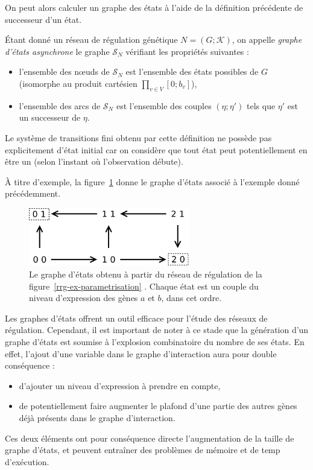 On peut alors calculer un graphe des états à l'aide de la définition précédente de successeur d'un état.
\begin{definition}
Étant donné un réseau de régulation génétique $N = (G ; \mathcal{K})$, on appelle \emph{graphe d'états asynchrone} le graphe $\mathcal{S}_N$ vérifiant les propriétés suivantes :
\begin{itemize}
  \item l'ensemble des n\oe uds de $\mathcal{S}_N$ est l'ensemble des états possibles de $G$ (isomorphe au produit cartésien $\prod_{v \in V} [0 ; b_v]$),
  \item l'ensemble des arcs de $\mathcal{S}_N$ est l'ensemble des couples $(\eta ; \eta')$ tels que $\eta'$ est un successeur de $\eta$.
\end{itemize}
\end{definition}

Le système de transitions fini obtenu par cette définition ne possède pas explicitement d'état initial car on considère que tout état peut potentiellement en être un (selon l'instant où l'observation débute).

À titre d'exemple, la figure~\ref{rrg-graphe-d-etats} donne le graphe d'états associé à l'exemple donné précédemment.

\begin{figure}[ht]
  \centering\includegraphics[width=7cm]{figs/graphe-d-etats}
  \caption{Le graphe d'états obtenu à partir du réseau de régulation de la figure~\ref{rrg-ex-parametrisation} \cite{richard-comet-bernot-08}. Chaque état est un couple du niveau d'expression des gènes $a$ et $b$, dans cet ordre.}
  \label{rrg-graphe-d-etats}
\end{figure}

Les graphes d'états offrent un outil efficace pour l'étude des réseaux de régulation. Cependant, il est important de noter à ce stade que la génération d'un graphe d'états est soumise à l'explosion combinatoire du nombre de ses états. En effet, l'ajout d'une variable dans le graphe d'interaction aura pour double conséquence :
\begin{itemize}
  \item d'ajouter un niveau d'expression à prendre en compte,
  \item de potentiellement faire augmenter le plafond d'une partie des autres gènes déjà présents dans le graphe d'interaction.
\end{itemize}
Ces deux éléments ont pour conséquence directe l'augmentation de la taille de graphe d'états, et peuvent entraîner des problèmes de mémoire et de temp d'exécution.

